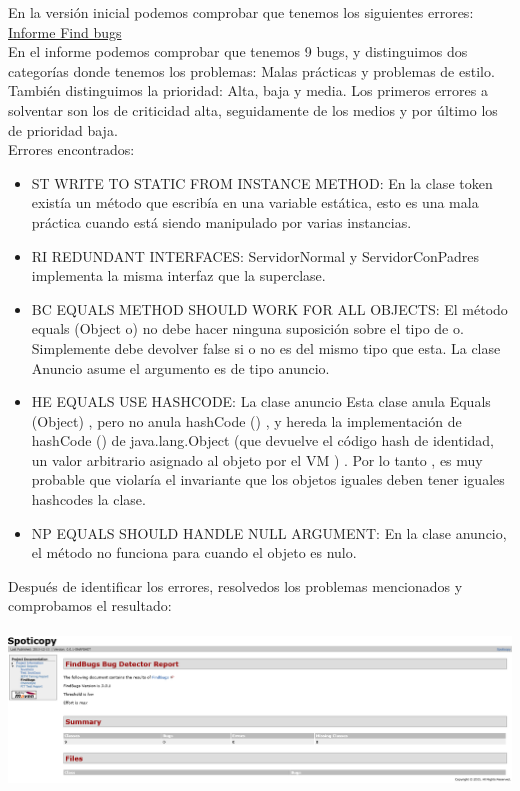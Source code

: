 \documentclass[12pt, a4paper, titlepage]{article}
\begin{document}
	En la versión inicial podemos comprobar que tenemos los siguientes errores:
	\href{Informes/SiteTestInicial/findbugs.html}{Informe Find bugs} \\
	En el informe podemos comprobar que tenemos 9 bugs, y distinguimos dos categorías donde tenemos los problemas: Malas prácticas y problemas de estilo. También distinguimos la prioridad: Alta, baja y media.
	Los primeros errores a solventar son los de criticidad alta, seguidamente de los medios y por último los de prioridad baja.\\
	Errores encontrados:
		\begin{itemize}
			\item 	ST WRITE TO STATIC FROM INSTANCE METHOD: En la clase token existía un método que escribía en una variable estática, esto es una mala práctica cuando está siendo manipulado por varias instancias.
			\item 	RI REDUNDANT INTERFACES: ServidorNormal y ServidorConPadres implementa la misma interfaz que la superclase.
			\item BC EQUALS METHOD SHOULD WORK FOR ALL OBJECTS: El método equals (Object o) no debe hacer ninguna suposición sobre el tipo de o. Simplemente debe devolver false si o no es del mismo tipo que esta. La clase Anuncio asume el argumento es de tipo anuncio.
			\item HE EQUALS USE HASHCODE: La clase anuncio Esta clase anula Equals (Object) , pero no anula hashCode () , y hereda la implementación de hashCode () de java.lang.Object (que devuelve el código hash de identidad, un valor arbitrario asignado al objeto por el VM ) . Por lo tanto , es muy probable que violaría el invariante que los objetos iguales deben tener iguales hashcodes la clase.
			\item NP EQUALS SHOULD HANDLE NULL ARGUMENT: En la clase anuncio, el método no funciona para cuando el objeto es nulo.	
		\end{itemize}
		Después de identificar los errores, resolvedos los problemas mencionados y comprobamos el resultado:\\
		\\
	\includegraphics[width=15cm]{Imagenes/FindsBugs2.png} \\
	
\end{document}
